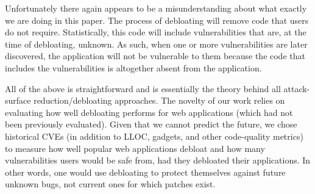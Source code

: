 \noindent Unfortunately there again appears to be a misunderstanding about what exactly we are doing in this paper. The process of debloating will remove code that users do not require. Statistically, this code will include vulnerabilities that are, at the time of debloating, unknown. As such, when one or more vulnerabilities are later discovered, the application will not be vulnerable to them because the code that includes the vulnerabilities is altogether absent from the application.

All of the above is straightforward and is essentially the theory behind all attack-surface reduction/debloating approaches. The novelty of our work relies on evaluating how well debloating performs for web applications (which had not been previously evaluated). Given that we cannot predict the future, we chose historical CVEs (in addition to LLOC, gadgets, and other code-quality metrics) to measure how well popular web applications debloat and how many vulnerabilities users would be safe from, had they debloated their applications. In other words, one would use debloating to protect themselves against future unknown bugs, not current ones for which patches exist.
